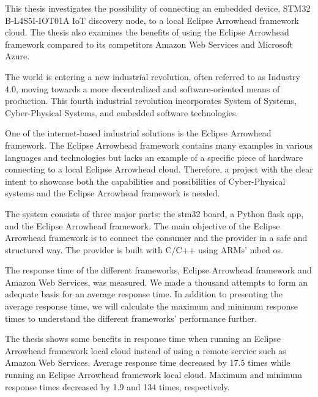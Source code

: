 This thesis investigates the possibility of connecting an embedded device, STM32 B-L4S5I-IOT01A IoT discovery node, to a local Eclipse Arrowhead framework cloud.
The thesis also examines the benefits of using the Eclipse Arrowhead framework compared to its competitors Amazon Web Services and Microsoft Azure.

The world is entering a new industrial revolution, often referred to as Industry 4.0, moving towards a more decentralized and software-oriented means of production.
This fourth industrial revolution incorporates System of Systems, Cyber-Physical Systems, and embedded software technologies.

One of the internet-based industrial solutions is the Eclipse Arrowhead framework. 
The Eclipse Arrowhead framework contains many examples in various languages and technologies but lacks an example of a specific piece of hardware connecting to a local Eclipse Arrowhead cloud.
Therefore, a project with the clear intent to showcase both the capabilities and possibilities of Cyber-Physical systems and the Eclipse Arrowhead framework is needed.

The system consists of three major parts: the stm32 board, a Python flask app, and the Eclipse Arrowhead framework.
The main objective of the Eclipse Arrowhead framework is to connect the consumer and the provider in a safe and structured way.
The provider is built with C/C++ using ARMs' mbed os. 

The response time of the different frameworks, Eclipse Arrowhead framework and Amazon Web Services, was measured.
We made a thousand attempts to form an adequate basis for an average response time. 
In addition to presenting the average response time, we will calculate the maximum and minimum response times to understand the different frameworks' performance further. 

The thesis shows some benefits in response time when running an Eclipse Arrowhead framework local cloud instead of using a remote service such as Amazon Web Services. 
Average response time decreased by 17.5 times while running an Eclipse Arrowhead framework local cloud.
Maximum and minimum response times decreased by 1.9 and 134 times, respectively.  